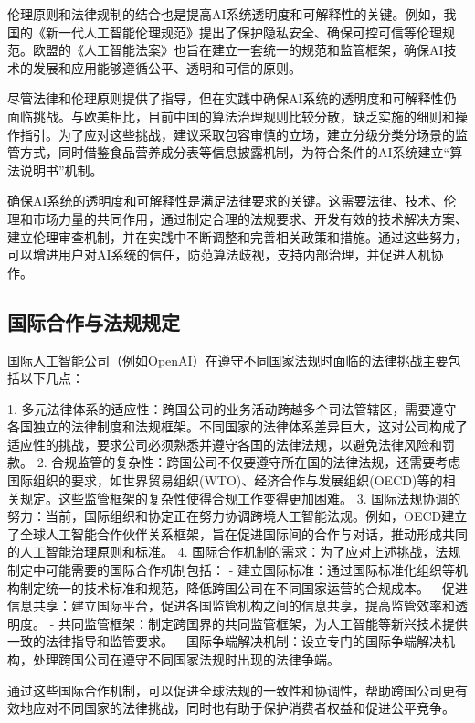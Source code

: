 伦理原则和法律规制的结合也是提高AI系统透明度和可解释性的关键。例如，我国的《新一代人工智能伦理规范》提出了保护隐私安全、确保可控可信等伦理规范。欧盟的《人工智能法案》也旨在建立一套统一的规范和监管框架，确保AI技术的发展和应用能够遵循公平、透明和可信的原则。

尽管法律和伦理原则提供了指导，但在实践中确保AI系统的透明度和可解释性仍面临挑战。与欧美相比，目前中国的算法治理规则比较分散，缺乏实施的细则和操作指引。为了应对这些挑战，建议采取包容审慎的立场，建立分级分类分场景的监管方式，同时借鉴食品营养成分表等信息披露机制，为符合条件的AI系统建立“算法说明书”机制。

确保AI系统的透明度和可解释性是满足法律要求的关键。这需要法律、技术、伦理和市场力量的共同作用，通过制定合理的法规要求、开发有效的技术解决方案、建立伦理审查机制，并在实践中不断调整和完善相关政策和措施。通过这些努力，可以增进用户对AI系统的信任，防范算法歧视，支持内部治理，并促进人机协作。

 
\subsection{国际合作与法规规定}

国际人工智能公司（例如OpenAI）在遵守不同国家法规时面临的法律挑战主要包括以下几点：

1. 多元法律体系的适应性：跨国公司的业务活动跨越多个司法管辖区，需要遵守各国独立的法律制度和法规框架。不同国家的法律体系差异巨大，这对公司构成了适应性的挑战，要求公司必须熟悉并遵守各国的法律法规，以避免法律风险和罚款。
2. 合规监管的复杂性：跨国公司不仅要遵守所在国的法律法规，还需要考虑国际组织的要求，如世界贸易组织(WTO)、经济合作与发展组织(OECD)等的相关规定。这些监管框架的复杂性使得合规工作变得更加困难。
3. 国际法规协调的努力：当前，国际组织和协定正在努力协调跨境人工智能法规。例如，OECD建立了全球人工智能合作伙伴关系框架，旨在促进国际间的合作与对话，推动形成共同的人工智能治理原则和标准。
4. 国际合作机制的需求：为了应对上述挑战，法规制定中可能需要的国际合作机制包括：
  - 建立国际标准：通过国际标准化组织等机构制定统一的技术标准和规范，降低跨国公司在不同国家运营的合规成本。
  - 促进信息共享：建立国际平台，促进各国监管机构之间的信息共享，提高监管效率和透明度。
  - 共同监管框架：制定跨国界的共同监管框架，为人工智能等新兴技术提供一致的法律指导和监管要求。
  - 国际争端解决机制：设立专门的国际争端解决机构，处理跨国公司在遵守不同国家法规时出现的法律争端。
 
通过这些国际合作机制，可以促进全球法规的一致性和协调性，帮助跨国公司更有效地应对不同国家的法律挑战，同时也有助于保护消费者权益和促进公平竞争。
 

